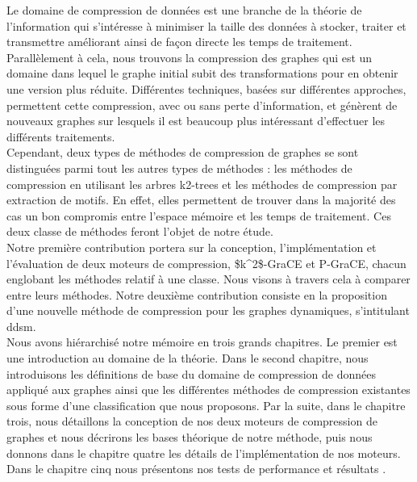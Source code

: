 \documentclass[a4paper,oneside,12pt]{report}
\theoremstyle{definition}
\begin{document}
	Le domaine de compression de données est une branche de la théorie de l'information qui s'intéresse à minimiser la taille des données à stocker, traiter et transmettre améliorant ainsi de façon directe les temps de traitement. Parallèlement à cela, nous trouvons la compression des graphes qui est un domaine dans lequel le graphe initial subit des transformations pour en obtenir une version plus réduite. Différentes techniques, basées sur différentes approches, permettent cette compression, avec ou sans perte d'information, et génèrent de nouveaux graphes sur lesquels il est beaucoup plus intéressant d'effectuer les différents traitements.\\ 

Cependant, deux types de méthodes de compression de graphes se sont distinguées parmi tout les autres types de méthodes : les méthodes de compression en utilisant les arbres k2-trees et les méthodes de compression par extraction de motifs. En effet, elles permettent de trouver dans la majorité des cas un bon compromis entre l'espace mémoire et les temps de traitement. Ces deux classe de méthodes feront l'objet de notre étude.\\
		
			Notre première contribution  portera sur la conception, l'implémentation et l'évaluation de 	deux moteurs de compression, 
			\gls{$k^2$-GraCE} 
			 et \gls{P-GraCE}, chacun englobant les méthodes relatif à une classe. Nous visons à travers cela à comparer entre leurs méthodes. Notre deuxième contribution consiste en la proposition d'une nouvelle méthode de compression pour les graphes dynamiques, s'intitulant 
			 \gls{ddsm}. \\
			
			
			 Nous avons hiérarchisé notre mémoire en trois grands chapitres. Le premier est une introduction au domaine de la théorie. Dans le second chapitre, nous introduisons les définitions de base du domaine de compression de données appliqué aux graphes ainsi que les différentes méthodes de compression existantes sous forme d'une classification que nous proposons. Par la suite, dans le chapitre trois, nous détaillons la conception de nos deux moteurs de compression de graphes et nous décrirons les bases théorique de notre méthode, puis nous donnons dans le chapitre quatre les détails de l'implémentation de nos moteurs. Dans le chapitre cinq nous présentons nos tests de performance et résultats .
	
\end{document}
